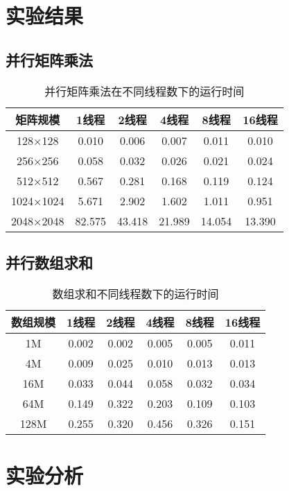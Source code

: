 \documentclass{SYSUReport}
\begin{document}
\section{实验结果}
\subsection{并行矩阵乘法}

\begin{table}[H]
\centering
\caption{并行矩阵乘法在不同线程数下的运行时间}
\begin{tabular}{cccccc}
\toprule
矩阵规模 & 1线程 & 2线程 & 4线程 & 8线程 & 16线程 \\
\midrule
128×128 & 0.010 & 0.006 & 0.007 & 0.011 & 0.010 \\
256×256 & 0.058 & 0.032 & 0.026 & 0.021 & 0.024 \\
512×512 & 0.567 & 0.281 & 0.168 & 0.119 & 0.124 \\
1024×1024 & 5.671 & 2.902 & 1.602 & 1.011 & 0.951 \\
2048×2048 & 82.575 & 43.418 & 21.989 & 14.054 & 13.390 \\
\bottomrule
\end{tabular}
\end{table}
\subsection{并行数组求和}
\begin{table}[h]
\centering
\caption{数组求和不同线程数下的运行时间}
\begin{tabular}{cccccc}
\toprule
数组规模 & 1线程 & 2线程 & 4线程 & 8线程 & 16线程 \\
\midrule
1M & 0.002 & 0.002 & 0.005 & 0.005 & 0.011 \\
4M & 0.009 & 0.025 & 0.010 & 0.013 & 0.013 \\
16M & 0.033 & 0.044 & 0.058 & 0.032 & 0.034 \\
64M & 0.149 & 0.322 & 0.203 & 0.109 & 0.103 \\
128M & 0.255 & 0.320 & 0.456 & 0.326 & 0.151 \\
\bottomrule
\end{tabular}
\end{table}

\section{实验分析}
\end{document}
